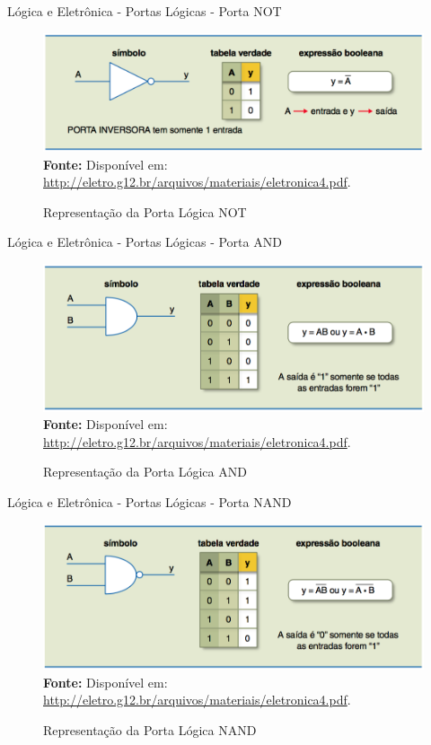 \documentclass[aspectratio=169]{beamer}
\begin{document}
	
	\begin{frame}{Lógica e Eletrônica - Portas Lógicas - Porta NOT}
		\begin{figure}[h]
			\centering
			\caption{Representação da Porta Lógica NOT}
			\includegraphics[height=0.55\textheight]{img/ed/ed-porta_not.png}
			\\
			{\footnotesize \textbf{Fonte:} Disponível em: \url{http://eletro.g12.br/arquivos/materiais/eletronica4.pdf}.}
			\label{fig:ed-porta_NOT}
		\end{figure}
	\end{frame}
	
	\begin{frame}{Lógica e Eletrônica - Portas Lógicas - Porta AND}
		\begin{figure}[h]
			\centering
			\caption{Representação da Porta Lógica AND}
			\includegraphics[height=0.66\textheight]{img/ed/ed-porta_and.png}
			\\
			{\footnotesize \textbf{Fonte:} Disponível em: \url{http://eletro.g12.br/arquivos/materiais/eletronica4.pdf}.}
			\label{fig:ed-porta_AND}
		\end{figure}
	\end{frame}
	
	\begin{frame}{Lógica e Eletrônica - Portas Lógicas - Porta NAND}
		\begin{figure}[h]
			\centering
			\caption{Representação da Porta Lógica NAND}
			\includegraphics[height=0.66\textheight]{img/ed/ed-porta_nand.png}
			\\
			{\footnotesize \textbf{Fonte:} Disponível em: \url{http://eletro.g12.br/arquivos/materiais/eletronica4.pdf}.}
			\label{fig:ed-porta_NAND}
		\end{figure}
	\end{frame}
	
\end{document}
